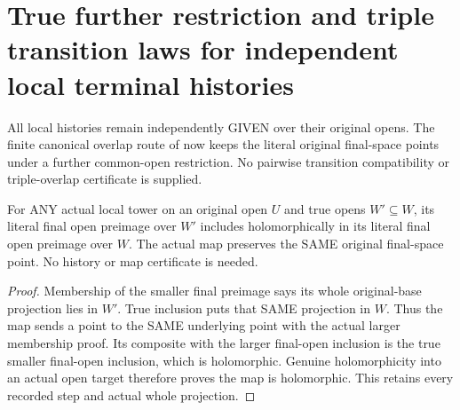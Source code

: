 \section{True further restriction and triple transition laws for independent local terminal histories}

All local histories remain independently GIVEN over their original opens.
The finite canonical overlap route of
\cite{wlodarczyk05-hironaka,bierstone-milman08-functoriality} now keeps
the literal original final-space points under a further common-open
restriction. No pairwise transition compatibility or triple-overlap
certificate is supplied.

\begin{lemma}
\label{hir:original-terminal-overlap-actual-common-open-inclusion}
\leanok
For ANY actual local tower on an original open $U$ and true opens
$W'\subseteq W$, its literal final open preimage over $W'$ includes
holomorphically in its literal final open preimage over $W$. The actual
map preserves the SAME original final-space point. No history or map
certificate is needed.
\end{lemma}
\begin{proof}
Membership of the smaller final preimage says its whole original-base
projection lies in $W'$. True inclusion puts that SAME projection in $W$.
Thus the map sends a point to the SAME underlying point with the actual
larger membership proof. Its composite with the larger final-open inclusion
is the true smaller final-open inclusion, which is holomorphic. Genuine
holomorphicity into an actual open target therefore proves the map is
holomorphic. This retains every recorded step and actual whole projection.
\end{proof}

